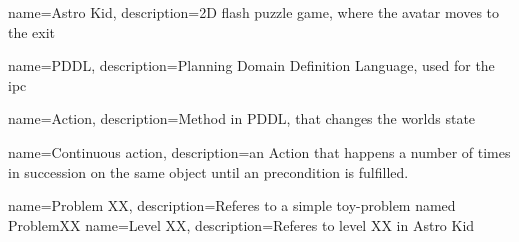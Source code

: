 \makeglossaries

{
	name={Astro Kid},
	description={2D flash puzzle game, where the avatar moves to the exit }
}

{
	name={PDDL},
	description={Planning Domain Definition Language, used for the \acrshort{ipc}}
}

{
	name={Action},
	description={Method in PDDL, that changes the worlds state}
}
 
 
 {
 	name={Continuous action},
 	description={an Action that happens a number of times in succession on the same object until an precondition is fulfilled.}
 }
 
  {
  	name={Problem XX},
  	description={Referes to a simple toy-problem named ProblemXX}
  }
   {
   	name={Level XX},
   	description={Referes to level XX in Astro Kid}
   }

